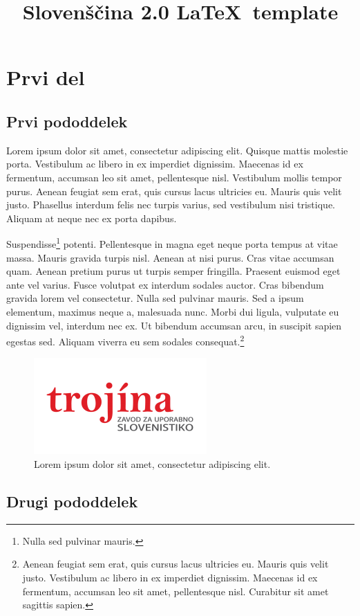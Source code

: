\documentclass[slovene,georgia]{slo20}
\affiliation{%
Magic and Macaroons Lab, University of Southern Atlantis\\
The Republic, Utopia}
\affiliation{%
ACME Research Group, University of Entenhausen\\
Entenhausen, Germany}
\title{Slovenščina 2.0 \LaTeX\ template}
\begin{document}
\section{Prvi del}

\subsection{Prvi pododdelek}

Lorem ipsum dolor sit amet, consectetur adipiscing elit. Quisque mattis
molestie porta. Vestibulum ac libero in ex imperdiet dignissim. Maecenas
id ex fermentum, accumsan leo sit amet, pellentesque nisl. Vestibulum
mollis tempor purus. Aenean feugiat sem erat, quis cursus lacus ultricies
eu. Mauris quis velit justo. Phasellus interdum felis nec turpis varius,
sed vestibulum nisi tristique. Aliquam at neque nec ex porta dapibus.

Suspendisse\footnote{ Nulla sed pulvinar mauris.} potenti. Pellentesque in
magna eget neque porta tempus at vitae massa. Mauris gravida turpis nisl.
Aenean at nisi purus. Cras vitae accumsan quam. Aenean pretium purus ut
turpis semper fringilla. Praesent euismod eget ante vel varius. Fusce
volutpat ex interdum sodales auctor.  Cras bibendum gravida lorem vel
consectetur. Nulla sed pulvinar mauris.  Sed a ipsum elementum, maximus
neque a, malesuada nunc. Morbi dui ligula, vulputate eu dignissim vel,
interdum nec ex. Ut bibendum accumsan arcu, in suscipit sapien egestas
sed. Aliquam viverra eu sem sodales consequat.\footnote{Aenean feugiat sem
erat, quis cursus lacus ultricies eu. Mauris quis velit justo. Vestibulum
ac libero in ex imperdiet dignissim. Maecenas id ex fermentum, accumsan
leo sit amet, pellentesque nisl. Curabitur sit amet sagittis sapien.}

\begin{figure}
\centering
\includegraphics[scale=0.75]{trojina}
\caption{%
Lorem ipsum dolor sit amet, consectetur adipiscing elit.}
\end{figure}

\subsection{Drugi pododdelek}
\end{document}
